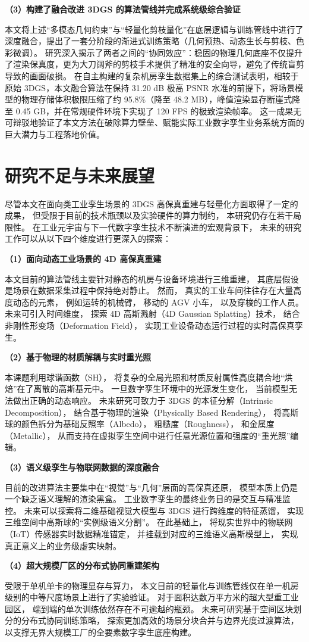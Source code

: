 \textbf{（3）构建了融合改进 3DGS 的算法管线并完成系统级综合验证}

本文将上述“多模态几何约束”与“轻量化剪枝量化”在底层逻辑与训练管线中进行了深度融合，提出了一套分阶段的渐进式训练策略（几何预热、动态生长与剪枝、色彩微调）。
研究深入揭示了两者之间的“协同效应”：稳固的物理几何底座不仅提升了渲染保真度，更为大刀阔斧的剪枝手术提供了精准的安全向导，避免了传统盲剪导致的画面破损。
在自主构建的复杂机房孪生数据集上的综合测试表明，相较于原始 3DGS，本文融合算法在保持 31.20 dB 极高 PSNR 水准的前提下，将场景模型的物理存储体积极限压缩了约 95.8\%（降至 48.2 MB），峰值渲染显存断崖式降至 0.45 GB，并在常规硬件环境下实现了 120 FPS 的极致渲染帧率。
这一成果无可辩驳地验证了本文方法在破除算力壁垒、赋能实际工业数字孪生业务系统方面的巨大潜力与工程落地价值。

\section{研究不足与未来展望}
\label{sec:future_work}

尽管本文在面向类工业孪生场景的 3DGS 高保真重建与轻量化方面取得了一定的成果，
但受限于目前的技术瓶颈以及实验硬件的算力制约，
本研究仍存在若干局限性。
在工业元宇宙与下一代数字孪生技术不断演进的宏观背景下，
未来的研究工作可以从以下四个维度进行更深入的探索：

\textbf{（1）面向动态工业场景的 4D 高保真重建}

本文目前的算法管线主要针对静态的机房与设备环境进行三维重建，
其底层假设是场景在数据采集过程中保持绝对静止。
然而，
真实的工业车间往往存在大量高度动态的元素，
例如运转的机械臂，
移动的 AGV 小车，
以及穿梭的工作人员。
未来可引入时间维度，
探索 4D 高斯溅射（4D Gaussian Splatting）技术，
结合非刚性形变场（Deformation Field），
实现工业设备动态运行过程的实时高保真孪生。

\textbf{（2）基于物理的材质解耦与实时重光照}

本课题利用球谐函数（SH），
将复杂的全局光照和材质反射属性高度耦合地“烘焙”在了离散的高斯基元中。
一旦数字孪生环境中的光源发生变化，
当前模型无法做出正确的动态响应。
未来研究可致力于 3DGS 的本征分解（Intrinsic Decomposition），
结合基于物理的渲染（Physically Based Rendering），
将高斯球的颜色拆分为基础反照率（Albedo），
粗糙度（Roughness），
和金属度（Metallic），
从而支持在虚拟孪生空间中进行任意光源位置和强度的“重光照”编辑。

\textbf{（3）语义级孪生与物联网数据的深度融合}

目前的改进算法主要集中在“视觉”与“几何”层面的高保真还原，
模型本质上仍是一个缺乏语义理解的渲染黑盒。
工业数字孪生的最终业务目的是交互与精准监控。
未来可以探索将二维基础视觉大模型与 3DGS 进行跨维度的特征蒸馏，
实现三维空间中高斯球的“实例级语义分割”。
在此基础上，
将现实世界中的物联网（IoT）传感器实时数据精准锚定，
并挂载到对应的三维语义高斯模型上，
实现真正意义上的业务级虚实映射。

\textbf{（4）超大规模厂区的分布式协同重建架构}

受限于单机单卡的物理显存与算力，
本文目前的轻量化与训练管线仅在单一机房级别的中等尺度场景上进行了实验验证。
对于面积达数万平方米的超大型重工业园区，
端到端的单次训练依然存在不可逾越的瓶颈。
未来可研究基于空间区块划分的分布式协同训练策略，
探索更加高效的场景分块合并与边界光度过渡算法，
以支撑无界大规模工厂的全要素数字孪生底座构建。